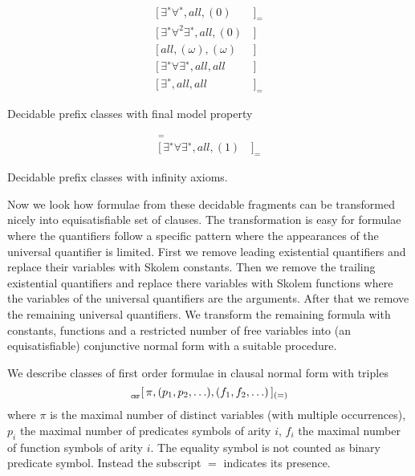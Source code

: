 \begin{table}[hbt]
\begin{align*}
[\,\exists^{∗}\forall^{∗}, all, (0)&\,]_{=} \tag{Bernays, Schönfinkel 1928, Ramsey 1932}
\\
[\,\exists^{∗}\forall^2\exists^{∗} , all, (0)&\,] \tag{Gödel 1932, Kalmár 1933, Schütte 1934}
\\
[\,all, (\omega), (\omega)&\,] \tag{Löb 1967, Gurevich 1969}
\\
[\,\exists^{∗}\forall\exists^{∗}, all, all&\,] \tag{Gurevich 1973}
\\
[\,\exists^{∗}, all, all&\,]_{=} \tag{Gurevich 1976}
\end{align*}
\caption[Decidable prefix classes]{Decidable prefix classes with final model property }
\label{tab:decidedable:FiniteModelProperty}
\end{table}

\begin{table}[hbt]
	\begin{align*}
	[\,all, (\omega), (1)&\,]_{=} \tag{Rabin 1969} 
	\\
	[\,\exists^{∗}\forall\exists^{∗}, all, (1)&\,]_{=} \tag{Shelah 1977}
	\end{align*}
	\caption[Decidable prefix classes]{Decidable prefix classes with infinity axioms. }
	\label{tab:decidable:InfinityAxioms}
\end{table}

Now we look how formulae from these decidable fragments can be transformed nicely into equisatisfiable set of clauses.
The transformation is easy for formulae where the quantifiers follow a specific pattern where the appearances of the universal quantifier is limited. First we remove leading existential quantifiers and replace their variables with Skolem constants.
Then we remove the trailing existential quantifiers and replace there variables with Skolem functions where the variables of the universal quantifiers are the arguments. After that we remove the remaining universal quantifiers. We transform the remaining formula with constants, functions and a restricted number of free variables into (an equisatisfiable) conjunctive normal form with a suitable procedure. 

\begin{definition}\label{def:prefix:class}
	We describe classes of first order formulae in clausal normal form with triples
	\[
	_{_\texttt{CNF}}[\, \pi, (p_1,p_2,\ldots), (f_1,f_2,\ldots)\,]_{(=)}
	\]
	where $\pi$ is the maximal number of distinct variables (with multiple occurrences),
	$p_i$ the maximal number of predicates symbols of arity $i$,
	$f_i$ the maximal number of function symbols of arity $i$.
	The equality symbol is not counted as binary predicate symbol.
	Instead the subscript $=$ indicates its presence.
\end{definition}

